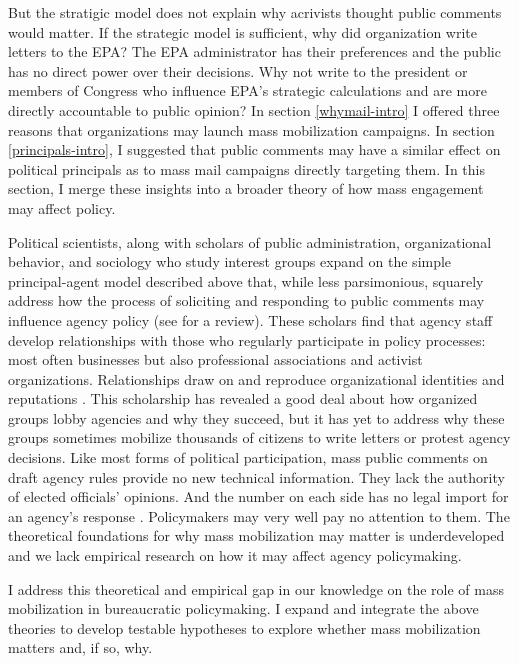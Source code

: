 But the stratigic model does not explain why acrivists thought public comments would matter. If the strategic model is sufficient, why did organization write letters to the EPA? The EPA administrator has their preferences and the public has no direct power over their decisions. Why not write to the president or members of Congress who influence EPA's strategic calculations and are more directly accountable to public opinion? In section \ref{whymail-intro} I offered three reasons that organizations may launch mass mobilization campaigns. In section \ref{principals-intro}, I suggested that public comments may have a similar effect on political principals as to mass mail campaigns directly targeting them. In this section, I merge these insights into a broader theory of how mass engagement may affect policy. 

Political scientists, along with scholars of public administration, organizational behavior, and sociology who study interest groups expand on the simple principal-agent model described above that, while less parsimonious, squarely address how the process of soliciting and responding to public comments may influence agency policy (see \citet{Yackee2018} for a review). These scholars find that agency staff develop relationships with those who regularly participate in policy processes: most often businesses but also professional associations and activist organizations. Relationships draw on and reproduce organizational identities and reputations \citep{Carpenter2001, Carpenter2014, carpenter2012}. This scholarship has revealed a good deal about how organized groups lobby agencies and why they succeed, but it has yet to address why these groups sometimes mobilize thousands of citizens to write letters or protest agency decisions. Like most forms of political participation, 
mass public comments on draft agency rules provide no new technical information. 
They lack the authority of elected officials' opinions. 
And the number on each side has no legal import for an agency's response \cite{West1995, Kerwin2011}.
Policymakers may very well pay no attention to them. The theoretical foundations for why mass mobilization may matter is underdeveloped and we lack empirical research on how it may affect agency policymaking. 

I address this theoretical and empirical gap in our knowledge on the role of mass mobilization in bureaucratic policymaking. I expand and integrate the above theories to develop testable hypotheses %
to explore whether mass mobilization matters and, if so, why. 

